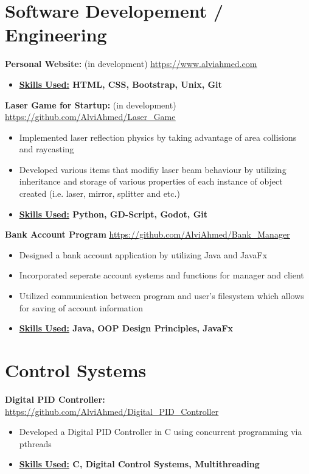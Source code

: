 \section{Software Developement / Engineering}


\textbf{Personal Website: }  (in development) \underline{\url{https://www.alviahmed.com}}
\begin{itemize}[noitemsep,nolistsep]
\item \textbf{\underline{Skills Used:} HTML, CSS, Bootstrap, Unix, Git}
\end{itemize}


\textbf{Laser Game for Startup: } (in development) \underline{\url{https://github.com/AlviAhmed/Laser_Game}}
\begin{itemize}[noitemsep,nolistsep]
\item Implemented laser reflection physics by taking advantage of area collisions and raycasting
\item Developed various items that modifiy laser beam behaviour by utilizing inheritance and storage of
  various properties of each instance of object created (i.e. laser, mirror, splitter and etc.)
\item \textbf{\underline{Skills Used:} Python, GD-Script, Godot, Git}
\end{itemize}


\textbf{Bank Account Program}
\underline{\url{https://github.com/AlviAhmed/Bank_Manager}}
\begin{itemize}[noitemsep,nolistsep]
\item Designed a bank account application by utilizing Java and JavaFx
\item Incorporated seperate account systems and functions for manager and client 
\item Utilized communication between program and user's filesystem which allows for saving of account information 
\item \textbf{\underline{Skills Used:} Java, OOP Design Principles, JavaFx}
\end{itemize}
\vspace{1em}


\section*{Control Systems}


\vspace{\spaces}
\textbf{Digital PID Controller: } \underline{\url{https://github.com/AlviAhmed/Digital_PID_Controller}}
\begin{itemize}[noitemsep,nolistsep]
\item Developed a Digital PID Controller in C using concurrent programming via pthreads
\item \textbf{ \underline{Skills Used:} C, Digital Control Systems, Multithreading}
\end{itemize}


